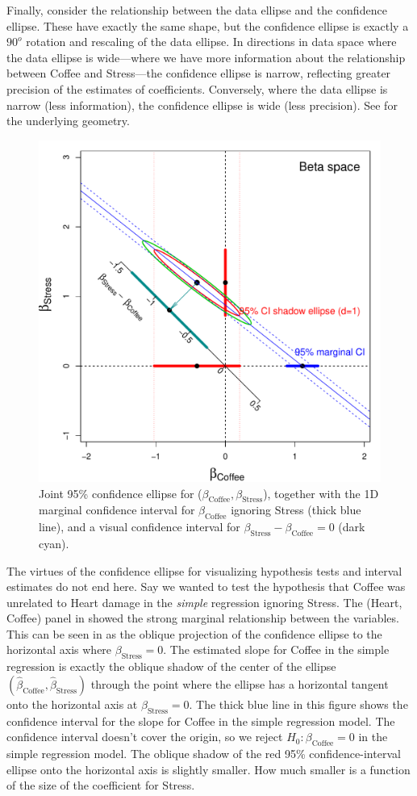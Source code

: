 Finally, consider the relationship between the data ellipse and the
confidence ellipse.  These have exactly the same shape, but
the confidence ellipse
is exactly a $90^o$ rotation and rescaling of the data ellipse.  In directions in
data space where the data ellipse is wide---where we have more information
about the relationship between Coffee and Stress---the confidence ellipse is
narrow, reflecting greater precision of the estimates of coefficients.
Conversely, where the data ellipse is narrow (less information), the
confidence ellipse is wide (less precision). See 
for the underlying geometry.

\begin{figure}[htb]
  \centering
  \includegraphics[width=.6\textwidth,clip]{fig/vis-reg-coffee13}
  \caption{Joint 95\% confidence ellipse for ($\beta_{\mathrm{Coffee}}, \beta_{\mathrm{Stress}}$),
  together with the 1D marginal confidence interval for $\beta_{\mathrm{Coffee}}$
  ignoring Stress (thick blue line), and a visual confidence interval for $\beta_{\mathrm{Stress}} - \beta_{\mathrm{Coffee}}=0$
  (dark cyan).
  }%
  \label{fig:vis-reg-coffee13}
\end{figure}

The virtues of the confidence ellipse for visualizing hypothesis tests and interval estimates
do not end here. Say we wanted to test the hypothesis that Coffee was unrelated to Heart damage
in the \emph{simple} regression ignoring Stress.  The (Heart, Coffee) panel in 
showed the strong marginal relationship between the variables.  This can be seen in  as
the oblique projection of the confidence ellipse to the horizontal axis where $\beta_{\mathrm{Stress}}=0$.
The estimated slope for Coffee in the simple regression is exactly the oblique shadow of
the center of the ellipse $(\widehat{\beta}_{\mathrm{Coffee}}, \widehat{\beta}_{\mathrm{Stress}})$
through the point where the ellipse has a horizontal tangent onto the horizontal axis at
$\beta_{\mathrm{Stress}}=0$. The thick blue line in this figure shows the confidence interval
for the slope for Coffee in the simple regression model. The confidence interval doesn't cover the origin, so
we reject $H_0:\beta_{\mathrm{Coffee}} = 0$ in the simple regression model.
The oblique shadow of the red 95\% confidence-interval ellipse onto the horizontal axis
is slightly smaller.  How much smaller is a function of the size of the coefficient for Stress.

